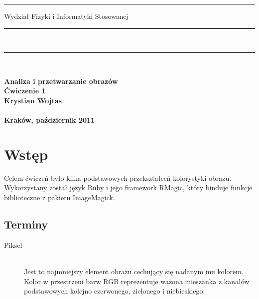 \documentclass[a4paper,12pt]{article}
\begin{document}
\rule{26mm}{0pt}
{\large\textsf{Wydział Fizyki i Informatyki Stosowanej}}\\
\rule{\textwidth}{3pt}\\
\rule[2ex]
{\textwidth}{1pt}\\
\vspace{7ex}
\begin{center}
{\bf\LARGE\textsf{Analiza i przetwarzanie obrazów}}\\
\vspace{13ex}
{\bf\huge\textsf{Ćwiczenie 1}}\\
\vspace{3ex}
{\sf \small } {\bf\small\textsf{Krystian Wojtas}}\\
\vspace{14ex}
{\sf \Large } {\bf\Large\textsf{}}\\
\vspace{22ex}
\textsf{\bf\large\textsf{Kraków, październik 2011}}
\end{center}


\newpage
\section{Wstęp}
Celem ćwiczeń było kilka podstawowych przekształceń kolorystyki obrazu. Wykorzystany został język Ruby i jego framework RMagic, który binduje funkcje biblioteczne z pakietu ImageMagick.

\subsection{Terminy}
\begin{description}
  \item[Piksel] \hfill \\
  Jest to najmniejszy element obrazu cechujący się nadanym mu kolorem. Kolor w przestrzeni barw RGB reprezentuje ważona mieszanka z kanałów podstawowych kolejno czerwonego, zielonego i niebieskiego.
\end{description}
\end{document}
